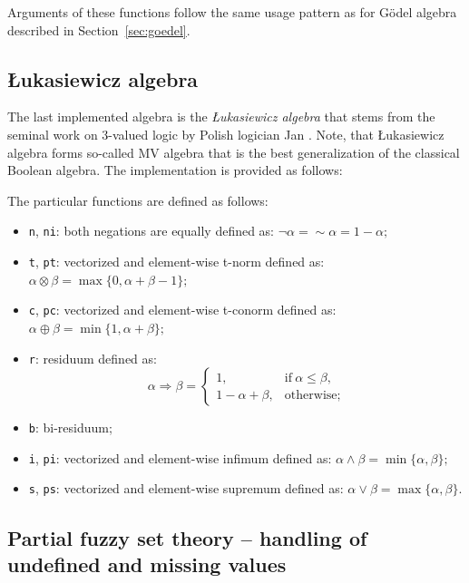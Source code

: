 \documentclass[review]{elsarticle}
\newcommand{\code}[1]{\texttt{#1}}
\begin{document}
Arguments of these functions follow the same usage pattern as for G\"odel algebra described in Section~\ref{sec:goedel}.



\subsection[Lukasiewicz algebra]{\L ukasiewicz algebra}

The last implemented algebra is the \emph{\L{}ukasiewicz algebra} that stems from the seminal work on 3-valued logic by Polish logician Jan \cite{lukasiewicz19673}. Note, that \L ukasiewicz algebra forms so-called MV algebra \citep{Chang:MV_1958} that is the best generalization of the classical Boolean algebra. The implementation is provided as follows:


%
The particular functions are defined as follows:

\begin{itemize}
    \item \code{n}, \code{ni}: both negations are equally defined as:
    $\lnot\alpha = {\sim}\alpha = 1 - \alpha;$
    \item \code{t}, \code{pt}: vectorized and element-wise t-norm defined as:
    $\alpha \otimes \beta = \max\{0, \alpha + \beta - 1\};$
    \item \code{c}, \code{pc}: vectorized and element-wise t-conorm defined as: $\alpha \oplus \beta = \min\{1, \alpha + \beta\};$
    \item \code{r}: residuum defined as:
    $$
    \alpha\Rightarrow\beta = \begin{cases}
    1, & \text{if}\ \alpha\le\beta, \\
    1 - \alpha + \beta, & \text{otherwise;}
    \end{cases}
    $$
    \item \code{b}: bi-residuum;
    \item \code{i}, \code{pi}: vectorized and element-wise infimum defined as:
    $\alpha \land \beta = \min\{\alpha, \beta\};$
    \item \code{s}, \code{ps}: vectorized and element-wise supremum defined as:
    $\alpha \lor \beta = \max\{\alpha, \beta\}.$
\end{itemize}



\subsection{Partial fuzzy set theory -- handling of undefined and missing values}
\label{sec:undefvals}
\end{document}
